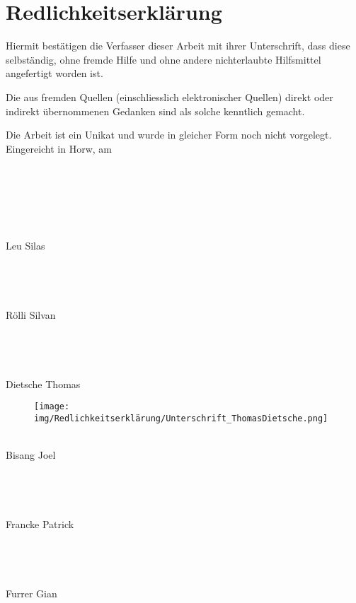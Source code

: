 \documentclass[../main.tex]{subfiles}
\begin{document}
\newpage
\section*{Redlichkeitserklärung}
\thispagestyle{empty}

 
Hiermit bestätigen die Verfasser dieser Arbeit mit ihrer Unterschrift, dass diese selbständig, ohne fremde Hilfe und ohne andere nichterlaubte Hilfsmittel angefertigt worden ist. 

 

Die aus fremden Quellen (einschliesslich elektronischer Quellen) direkt oder indirekt übernommenen Gedanken sind als solche kenntlich gemacht. 

 

Die Arbeit ist ein Unikat und wurde in gleicher Form noch nicht vorgelegt.\\

 

Eingereicht in Horw, am \docdate
\\
\\
\\
\\
\\
\\
\\
Leu Silas
\\
\\
\\
\\
\\
Rölli Silvan
\\
\\
\\
\\
\\
Dietsche Thomas
\begin{figure}[h!]
    \raggedright
    \texttt{[image: img/Redlichkeitserklärung/Unterschrift\_ThomasDietsche.png]} %
\end{figure}
\\
Bisang Joel
\\
\\
\\
\\
\\
Francke Patrick
\\
\\
\\
\\
\\
Furrer Gian
\end{document}
